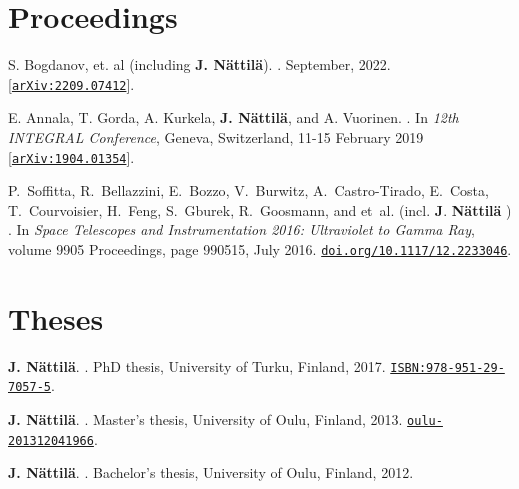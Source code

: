 \documentclass[letterpaper, onecolumn, 11pt]{article}
\begin{document}
\vspace{1cm}
\section*{Proceedings}

\begin{thebibliography}{1}
\vspace{-1cm}

S. Bogdanov, et. al (including \textbf{J. N\"attil\"a}).
.
\newblock September, 2022.
[\href{https://arxiv.org/abs/2209.07412}{\nolinkurl{arXiv:2209.07412}}].

E. {Annala}, T. {Gorda}, A. {Kurkela}, \textbf{J. {N{\"a}ttil{\"a}}}, and A. {Vuorinen}.
.
\newblock In {\em 12th INTEGRAL Conference}, Geneva, Switzerland, 11-15 February 2019
[\href{https://arxiv.org/abs/1904.01354}{\nolinkurl{arXiv:1904.01354}}].

P.~{Soffitta}, R.~{Bellazzini}, E.~{Bozzo}, V.~{Burwitz}, A.~{Castro-Tirado},
  E.~{Costa}, T.~{Courvoisier}, H.~{Feng}, S.~{Gburek}, R.~{Goosmann}, and
  et~al. (incl. \textbf{J}. \textbf{{N{\"a}ttil{\"a}}} )
.
\newblock In {\em Space Telescopes and Instrumentation 2016: Ultraviolet to
  Gamma Ray}, volume 9905 Proceedings, page 990515, July 2016.
\href{https://doi.org/10.1117/12.2233046}{\nolinkurl{doi.org/10.1117/12.2233046}}.
\end{thebibliography}



\vspace{1cm}
\section*{Theses}
\vspace{-1cm}

%
\begin{thebibliography}{3}

\textbf{J. N\"attil\"a}.
.
\newblock PhD thesis, University of Turku, Finland, 2017. \href{http://urn.fi/URN:ISBN:978-951-29-7057-5}{\nolinkurl{ISBN:978-951-29-7057-5}}.

\textbf{J. N\"attil\"a}.
.
\newblock Master's thesis, University of Oulu, Finland, 2013. \href{http://urn.fi/URN:NBN:fi:oulu-201312041966}{\nolinkurl{oulu-201312041966}}.

\textbf{J. N\"attil\"a}.
.
\newblock Bachelor's thesis, University of Oulu, Finland, 2012.

\end{thebibliography}
\end{document}
